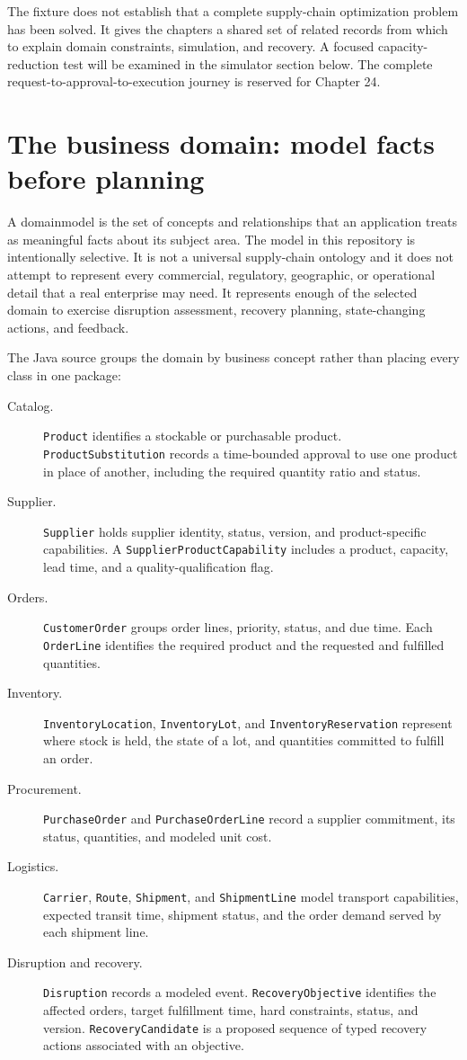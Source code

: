 The fixture does not establish that a complete supply-chain optimization problem has been solved. It gives the chapters a shared set of related records from which to explain domain constraints, simulation, and recovery. A focused capacity-reduction test will be examined in the simulator section below. The complete request-to-approval-to-execution journey is reserved for Chapter 24.

\section{The business domain: model facts before planning}
\label{sec:ch19-domain-model}

A \gls{domainmodel} is the set of concepts and relationships that an application treats as meaningful facts about its subject area. The model in this repository is intentionally selective. It is not a universal supply-chain ontology and it does not attempt to represent every commercial, regulatory, geographic, or operational detail that a real enterprise may need. It represents enough of the selected domain to exercise disruption assessment, recovery planning, state-changing actions, and feedback.

The Java source groups the domain by business concept rather than placing every class in one package:

\begin{description}
  \item[Catalog.] \texttt{Product} identifies a stockable or purchasable product. \texttt{ProductSubstitution} records a time-bounded approval to use one product in place of another, including the required quantity ratio and status.
  \item[Supplier.] \texttt{Supplier} holds supplier identity, status, version, and product-specific capabilities. A \texttt{SupplierProductCapability} includes a product, capacity, lead time, and a quality-qualification flag.
  \item[Orders.] \texttt{CustomerOrder} groups order lines, priority, status, and due time. Each \texttt{OrderLine} identifies the required product and the requested and fulfilled quantities.
  \item[Inventory.] \texttt{InventoryLocation}, \texttt{InventoryLot}, and \texttt{InventoryReservation} represent where stock is held, the state of a lot, and quantities committed to fulfill an order.
  \item[Procurement.] \texttt{PurchaseOrder} and \texttt{PurchaseOrderLine} record a supplier commitment, its status, quantities, and modeled unit cost.
  \item[Logistics.] \texttt{Carrier}, \texttt{Route}, \texttt{Shipment}, and \texttt{ShipmentLine} model transport capabilities, expected transit time, shipment status, and the order demand served by each shipment line.
  \item[Disruption and recovery.] \texttt{Disruption} records a modeled event. \texttt{RecoveryObjective} identifies the affected orders, target fulfillment time, hard constraints, status, and version. \texttt{RecoveryCandidate} is a proposed sequence of typed recovery actions associated with an objective.
\end{description}

